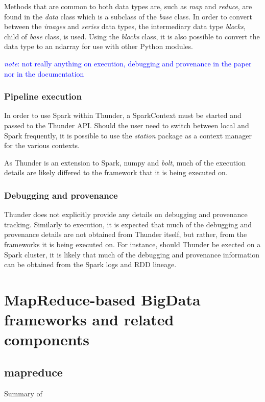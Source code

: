 \documentclass{report}
\newcommand{\note}[1]{\textcolor{blue}{\textit{note}: #1}}
\begin{document}
        Methods that are common to both data types are, such as \textit{map} and
        \textit{reduce}, are found in the \textit{data} class which is a
        subclass of the \textit{base} class. In order to convert between the
        \textit{images} and \textit{series} data types, the intermediary data
        type \textit{blocks}, child of \textit{base} class,  is used.  Using the
        \textit{blocks} class, it is also possible to convert the data type to
        an ndarray for use with other Python modules. 

        \note{not really anything on execution, debugging and provenance in the
        paper nor in the documentation} \subsection{Pipeline execution} In order
        to use Spark within Thunder, a SparkContext must be started and passed
        to the Thunder API. Should the user need to switch between local and
        Spark frequently, it is possible to use the \textit{station} package as
        a context manager for the various contexts.

        As Thunder is an extension to Spark, numpy and \textit{bolt}, much of
        the execution details are likely differed to the framework that it is
        being executed on.

        \subsection{Debugging and provenance} Thunder does not explicitly
        provide any details on debugging and provenance tracking. Similarly to
        execution, it is expected that much of the debugging and provenance
        details are not obtained from Thunder itself, but rather, from the
        frameworks it is being executed on. For instance, should Thunder be
        exected on a Spark cluster, it is likely that much of the debugging and
        provenance information can be obtained from the Spark logs and RDD
        lineage.
    
\chapter{MapReduce-based BigData frameworks and related components}
\section{mapreduce} Summary of ~\cite{mapred}
\end{document}
